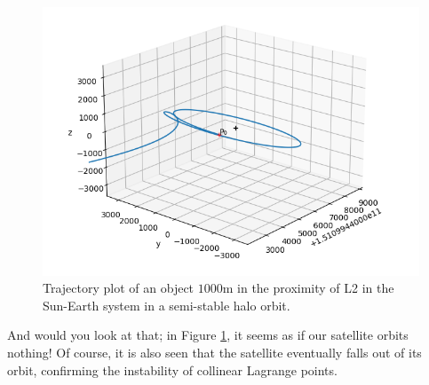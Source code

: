 \begin{samepage}
\begin{figure}[H]
	\includegraphics[scale=0.52]{3dplot2.png}
	\caption{Trajectory plot of an object $1000\si{\metre}$ in the proximity of L2 in the Sun-Earth system in a semi-stable halo orbit.}
	\label{fig:3dplot2}
\end{figure}
\end{samepage}
And would you look at that; in Figure \ref{fig:3dplot2}, it seems as if our satellite orbits nothing!
Of course, it is also seen that the satellite eventually falls out of its orbit, confirming the instability of collinear Lagrange points.

